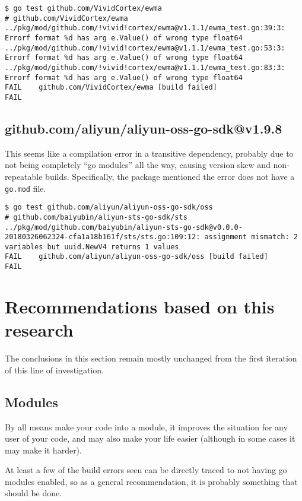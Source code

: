 \documentclass[a4paper]{paper}
\begin{document}
\begin{verbatim}
$ go test github.com/VividCortex/ewma
# github.com/VividCortex/ewma
../pkg/mod/github.com/!vivid!cortex/ewma@v1.1.1/ewma_test.go:39:3: Errorf format %d has arg e.Value() of wrong type float64
../pkg/mod/github.com/!vivid!cortex/ewma@v1.1.1/ewma_test.go:53:3: Errorf format %d has arg e.Value() of wrong type float64
../pkg/mod/github.com/!vivid!cortex/ewma@v1.1.1/ewma_test.go:83:3: Errorf format %d has arg e.Value() of wrong type float64
FAIL	github.com/VividCortex/ewma [build failed]
FAIL
\end{verbatim}

\subsection{github.com/aliyun/aliyun-oss-go-sdk@v1.9.8}

This seems like a compilation error in a transitive dependency,
probably due to not being completely ``go modules'' all the way,
causing version skew and non-repeatable builds. Specifically, the
package mentioned the error does not have a {\tt go.mod} file.

\begin{verbatim}
$ go test github.com/aliyun/aliyun-oss-go-sdk/oss
# github.com/baiyubin/aliyun-sts-go-sdk/sts
../pkg/mod/github.com/baiyubin/aliyun-sts-go-sdk@v0.0.0-20180326062324-cfa1a18b161f/sts/sts.go:109:12: assignment mismatch: 2 variables but uuid.NewV4 returns 1 values
FAIL	github.com/aliyun/aliyun-oss-go-sdk/oss [build failed]
FAIL
\end{verbatim}

\section{Recommendations based on this research}

The conclusions in this section remain mostly unchanged from the first
iteration of this line of investigation.

\subsection{Modules}

By all means make your code into a module, it improves the situation
for any user of your code, and may also make your life easier
(although in some cases it may make it harder).

At least a few of the build errors seen can be directly traced to not
having go modules enabled, so as a general recommendation, it is
probably something that should be done.
\end{document}
